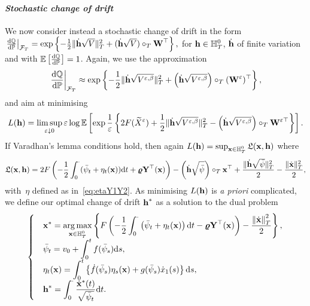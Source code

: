 \paragraph{\textit{Stochastic change of drift}}
We now consider instead a stochastic change of drift in the form
$
\left.\frac{\D\QQ}{\D\PP}\right\vert_{\Ff_T} =\nobreak \exp\left\{-\frac{1}{2}\|\dot{\hh}\sqrt{V}\|_{T}^2 + (\dot{\hh}\sqrt{V})\cT\Wf^\top\right\},
$
for $\hh \in \HH_T^0$, $\dot{\hh}$ of finite variation and with $\EE\left[\frac{\D\QQ}{\D\PP}\right]=1$. 
Again, we use the approximation
\[
\left.\frac{\D\QQ}{\D\PP}\right\vert_{\Ff_T} \approx \exp\left\{-\frac{1}{2}\|\dot{\hh}\sqrt{V^{\eps,\beta}}\|_{T}^2 + \left(\dot{\hh}\sqrt{V^{\eps,\beta}}\right)\cT({\Wf^\eps})^\top\right\},
\]
and aim at minimising
\[
L(\hh) = \limsup\limits_{\eps \downarrow 0} \eps\log\EE\left[\exp\frac{1}{\eps}\left\{
2F(\widetilde{X}^\eps) +\frac{1}{2}\|\dot{\hh}\sqrt{V^{\eps,\beta}}\|^2_T - \left (\dot{\hh}\sqrt{V^{\eps,\beta}}\right )\cT \Wf^{\eps\top}\right\}\right].
\]
If Varadhan's lemma conditions hold, then again
$L(\hh) = \sup_{\xx \in \HH_T^0}\Lf(\xx,\hh)$
where
$$
\Lf(\xx,\hh) = 2F\left(-\frac{1}{2}\int_0^\cdot(\bar\psi_t + \eta_t(\xx))\D t + \vrho \Yf^\top(\xx)\right) - \left (\dot{\hh}\sqrt{\bar\psi}\right )\cT \xx^\top + \frac{\|\dot{\hh}\sqrt{\bar\psi}\|_{T}^2}{2}
- \frac{\|\dot{\xx}\|_{T}^2}{2},
$$
with~$\eta$ defined as in~\eqref{eq:etaY1Y2}. As minimising $L(\hh)$ is \textit{a priori} complicated, we define our optimal change of drift $\hh^{*}$ as a solution to the dual problem
\[
\begin{cases}
&\displaystyle \xx^{*} = \argmax\limits_{\xx \in \HH_T^0} \left\{
F\left(-\frac{1}{2}\int_0^\cdot \left(\bar\psi_t + \eta_t(\xx)\right)\D t - \vrho \Yf^\top(\xx) \right)
- \frac{\left\|\dot{\xx}\right\|_{T}^2}{2}
\right\},\\
&\displaystyle \bar\psi_t = v_0 + \int_0^t f(\bar\psi_s)\D s, \\
&\displaystyle \eta_t(\xx) = \int_0^t\left\{\dot{f}(\bar\psi_s)\eta_s(\xx) + g(\bar\psi_s)\dot{x}_1(s)\right\}\D s, \\
&\displaystyle  \hh^{*} = \int_0^\cdot\frac{\dot{\xx}^{*}(t)}{\sqrt{\bar\psi_t}}\D t.
\end{cases}
\]

